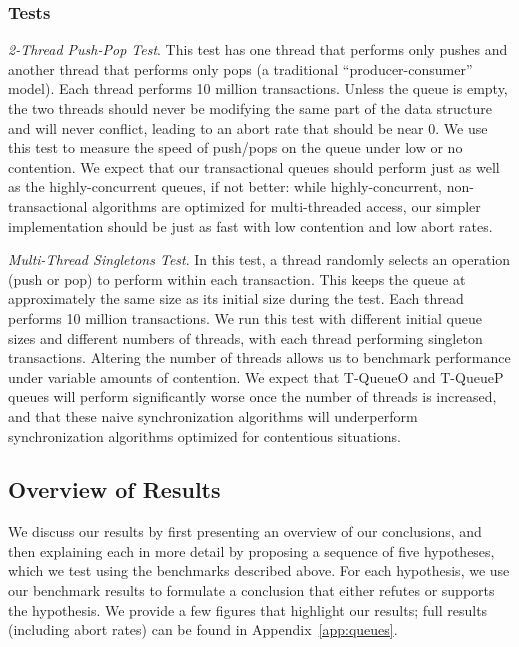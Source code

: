 \subsubsection{Tests}
    \emph{2-Thread Push-Pop Test}. This test has one thread that performs only pushes and another thread that performs only pops (a traditional ``producer-consumer'' model). Each thread performs 10 million transactions. Unless the queue is empty, the two threads should never be modifying the same part of the data structure and will never conflict, leading to an abort rate that should be near 0. We use this test to measure the speed of push/pops on the queue under low or no contention. We expect that our transactional queues should perform just as well as the highly-concurrent queues, if not better: while highly-concurrent, non-transactional algorithms are optimized for multi-threaded access, our simpler implementation should be just as fast with low contention and low abort rates.

\emph{Multi-Thread Singletons Test}.
    In this test, a thread randomly selects an operation (push or pop) to perform within each transaction. This keeps the queue at approximately the same size as its initial size during the test. Each thread performs 10 million transactions. We run this test with different initial queue sizes and different numbers of threads, with each thread performing singleton transactions. Altering the number of threads allows us to benchmark performance under variable amounts of contention. We expect that T-QueueO and T-QueueP queues will perform significantly worse once the number of threads is increased, and that these naive synchronization algorithms will underperform synchronization algorithms optimized for contentious situations.

\subsection{Overview of Results}

We discuss our results by first presenting an overview of our conclusions, and then explaining each in more detail by proposing a sequence of five hypotheses, which we test using the benchmarks described above. For each hypothesis, we use our benchmark results to formulate a conclusion that either refutes or supports the hypothesis.
We provide a few figures that highlight our results; full results (including abort rates) can be found in Appendix~\ref{app:queues}. 

